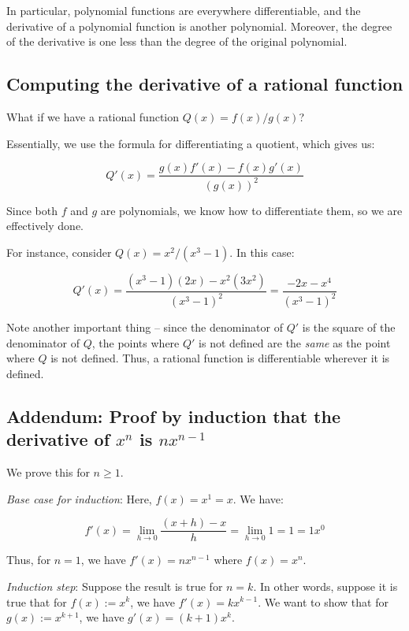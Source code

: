 \documentclass[10pt]{amsart}
\begin{document}
In particular, polynomial functions are everywhere differentiable, and
the derivative of a polynomial function is another
polynomial. Moreover, the degree of the derivative is one less than
the degree of the original polynomial.

\subsection{Computing the derivative of a rational function}

What if we have a rational function $Q(x) = f(x)/g(x)$?

Essentially, we use the formula for differentiating a quotient, which gives us:

\begin{equation*}
  Q'(x) = \frac{g(x)f'(x) - f(x)g'(x)}{(g(x))^2}
\end{equation*}

Since both $f$ and $g$ are polynomials, we know how to differentiate
them, so we are effectively done.

For instance, consider $Q(x) = x^2/(x^3 - 1)$. In this case:

\begin{equation*}
  Q'(x) = \frac{(x^3 - 1)(2x) - x^2(3x^2)}{(x^3 - 1)^2} = \frac{-2x - x^4}{(x^3 - 1)^2}
\end{equation*}

Note another important thing -- since the denominator of $Q'$ is the
square of the denominator of $Q$, the points where $Q'$ is not defined
are the {\em same} as the point where $Q$ is not defined. Thus, a
rational function is differentiable wherever it is defined.

\subsection*{Addendum: Proof by induction that the derivative of $x^n$ is $nx^{n-1}$}

We prove this for $n \ge 1$.

{\em Base case for induction}: Here, $f(x) = x^1 = x$. We have:

$$f'(x) = \lim_{h \to 0} \frac{(x + h) - x}{h} = \lim_{h \to 0} 1 = 1 = 1x^0$$

Thus, for $n = 1$, we have $f'(x) = nx^{n-1}$ where $f(x) = x^n$.

{\em Induction step}: Suppose the result is true for $n = k$. In other
words, suppose it is true that for $f(x) := x^k$, we have $f'(x) =
kx^{k-1}$. We want to show that for $g(x) := x^{k+1}$, we have $g'(x)
= (k+1)x^k$.
\end{document}
